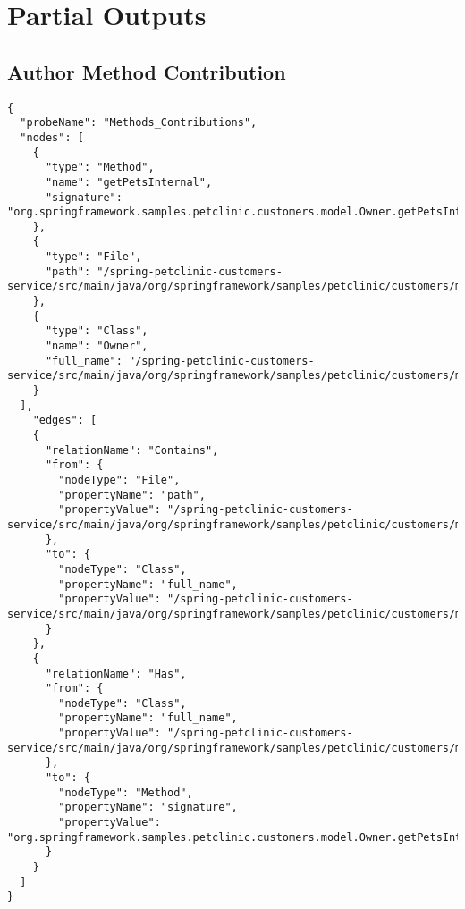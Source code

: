 \chapter{Partial Outputs}\label{appendix_a}

\section{Author Method Contribution}\label{appendix_sec:author_method_contributions}
\begin{lstlisting}
{
  "probeName": "Methods_Contributions",
  "nodes": [
    {
      "type": "Method",
      "name": "getPetsInternal",
      "signature": "org.springframework.samples.petclinic.customers.model.Owner.getPetsInternal()"
    },
    {
      "type": "File",
      "path": "/spring-petclinic-customers-service/src/main/java/org/springframework/samples/petclinic/customers/model/Owner.java"
    },
    {
      "type": "Class",
      "name": "Owner",
      "full_name": "/spring-petclinic-customers-service/src/main/java/org/springframework/samples/petclinic/customers/model/Owner.java:Owner"
    }
  ],
    "edges": [
    {
      "relationName": "Contains",
      "from": {
        "nodeType": "File",
        "propertyName": "path",
        "propertyValue": "/spring-petclinic-customers-service/src/main/java/org/springframework/samples/petclinic/customers/model/Owner.java"
      },
      "to": {
        "nodeType": "Class",
        "propertyName": "full_name",
        "propertyValue": "/spring-petclinic-customers-service/src/main/java/org/springframework/samples/petclinic/customers/model/Owner.java:Owner"
      }
    },
    {
      "relationName": "Has",
      "from": {
        "nodeType": "Class",
        "propertyName": "full_name",
        "propertyValue": "/spring-petclinic-customers-service/src/main/java/org/springframework/samples/petclinic/customers/model/Owner.java:Owner"
      },
      "to": {
        "nodeType": "Method",
        "propertyName": "signature",
        "propertyValue": "org.springframework.samples.petclinic.customers.model.Owner.getPetsInternal()"
      }
    }
  ]
}
\end{lstlisting}

